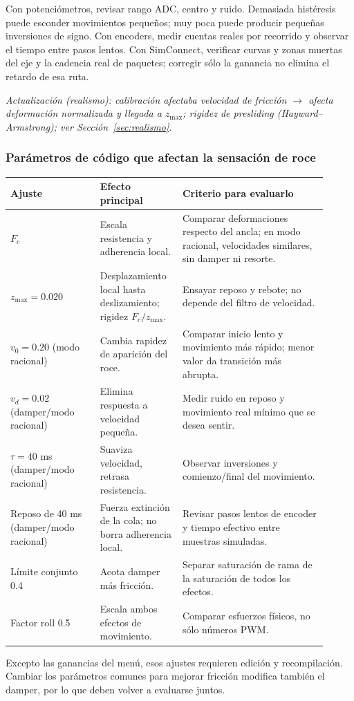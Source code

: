 \documentclass[11pt,a4paper]{article}
\newcommand{\code}[1]{\texttt{\detokenize{#1}}}
\begin{document}
Con potenciómetros, revisar rango ADC, centro y ruido. Demasiada histéresis puede esconder movimientos pequeños; muy poca puede producir pequeñas inversiones de signo. Con encoders, medir cuentas reales por recorrido y observar el tiempo entre pasos lentos. Con SimConnect, verificar curvas y zonas muertas del eje y la cadencia real de paquetes; corregir sólo la ganancia no elimina el retardo de esa ruta.

\textit{Actualización (realismo): calibración afectaba velocidad de fricción $\rightarrow$ afecta deformación normalizada y llegada a $z_{\max}$; rigidez de presliding (Hayward--Armstrong); ver Sección~\ref{sec:realismo}.}

\subsubsection{Parámetros de código que afectan la sensación de roce}
\begin{longtable}{p{0.26\linewidth}p{0.23\linewidth}p{0.42\linewidth}}
\toprule
Ajuste & Efecto principal & Criterio para evaluarlo\\
\midrule
$F_c$ & Escala resistencia y adherencia local. & Comparar deformaciones respecto del ancla; en modo racional, velocidades similares, sin damper ni resorte.\\
$z_{\max}=0.020$\par {\scriptsize\code{YOKE_FRICTION_PRESLIDE}} & Desplazamiento local hasta deslizamiento; rigidez $F_c/z_{\max}$. & Ensayar reposo y rebote; no depende del filtro de velocidad.\\
$v_0=0.20$ (modo racional) & Cambia rapidez de aparición del roce. & Comparar inicio lento y movimiento más rápido; menor valor da transición más abrupta.\\
$v_d=0.02$ (damper/modo racional) & Elimina respuesta a velocidad pequeña. & Medir ruido en reposo y movimiento real mínimo que se desea sentir.\\
$\tau=40$ ms (damper/modo racional) & Suaviza velocidad, retrasa resistencia. & Observar inversiones y comienzo/final del movimiento.\\
Reposo de 40 ms (damper/modo racional) & Fuerza extinción de la cola; no borra adherencia local. & Revisar pasos lentos de encoder y tiempo efectivo entre muestras simuladas.\\
Límite conjunto 0.4 & Acota damper más fricción. & Separar saturación de rama de la saturación de todos los efectos.\\
Factor roll 0.5 & Escala ambos efectos de movimiento. & Comparar esfuerzos físicos, no sólo números PWM.\\
\bottomrule
\end{longtable}
Excepto las ganancias del menú, esos ajustes requieren edición y recompilación. Cambiar los parámetros comunes para mejorar fricción modifica también el damper, por lo que deben volver a evaluarse juntos.
\end{document}
